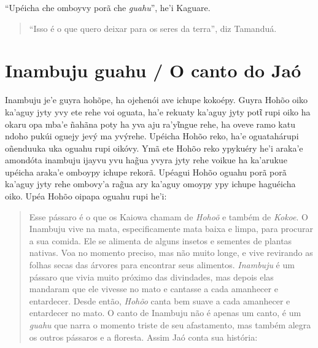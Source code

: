 ``Upéicha che omboyvy porã che \emph{guahu}'', he'i Kaguare.

\begin{quote}
``Isso é o que quero deixar para os seres da terra'', diz Tamanduá.
\end{quote}

\chapter{Inambuju guahu / O canto do Jaó}

Inambuju je'e guyra hohõpe, ha ojehenói ave ichupe kokoépy. Guyra Hohõo
oiko ka'aguy jyty yvy ete rehe voi oguata, ha'e rekuaty ka'aguy jyty
potῖ rupi oiko ha okaru opa mba'e ñahãna poty ha yva aju ra'yῖngue rehe,
ha oveve ramo katu ndoho pukúi oguejy jevý ma yvýrehe. Upéicha Hohõo
reko, ha'e oguatahárupi oñenduuka uka oguahu rupi oikóvy. Ymã ete Hohõo
reko ypykuéry he'i araka'e amondóta inambuju ijayvu yvu hag̃ua yvyra jyty
rehe voikue ha ka'arukue upéicha araka'e omboypy ichupe rekorã. Upéagui
Hohõo oguahu porã porã ka'aguy jyty rehe ombovy'a rag̃ua ary ka'aguy
omoypy ypy ichupe haguéicha oiko. Upéa Hohõo oipapa oguahu rupi he'i:

\begin{quote}
Esse pássaro é o que os Kaiowa chamam de \emph{Hohoõ} e também de
\emph{Kokoe}. O Inambuju vive na mata, especificamente mata baixa e
limpa, para procurar a sua comida. Ele se alimenta de alguns insetos e
sementes de plantas nativas. Voa no momento preciso, mas não muito
longe, e vive revirando as folhas secas das árvores para encontrar seus
alimentos. \emph{Inambuju} é um pássaro que vivia muito próximo das
divindades, mas depois elas mandaram que ele vivesse no mato e cantasse
a cada amanhecer e entardecer. Desde então, \emph{Hohõo} canta bem suave
a cada amanhecer e entardecer no mato. O canto de Inambuju não é apenas
um canto, é um \emph{guahu} que narra o momento triste de seu
afastamento, mas também alegra os outros pássaros e a floresta. Assim
Jaó conta sua história:
\end{quote}


